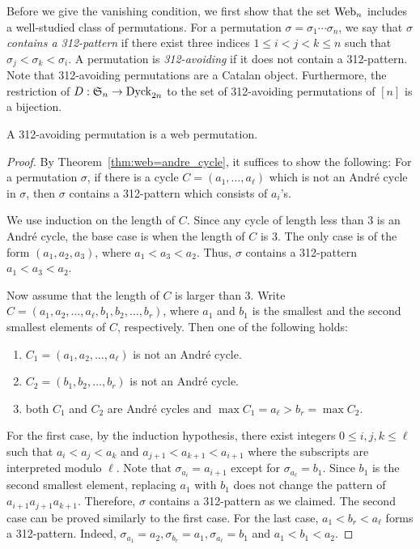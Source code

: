 Before we give the vanishing condition,
we first show that the set \( \operatorname{Web}_n \) includes a well-studied class of permutations.
For a permutation \( \sigma = \sigma_1\cdots \sigma_n \),
we say that \emph{\( \sigma \) contains a 312-pattern} if there exist three indices
\( 1\le i<j<k\le n \) such that \( \sigma_j<\sigma_k<\sigma_i \).
A permutation is \emph{312-avoiding} if it does not contain a 312-pattern.
Note that 312-avoiding permutations are a Catalan object. Furthermore,
the restriction of \( D:\mathfrak{S}_n\rightarrow \operatorname{Dyck}_{2n} \) to the set of
312-avoiding permutations of \( [n] \) is a bijection.
\begin{cor}\label{cor:312-avoiding}
  A 312-avoiding permutation is a web permutation.
\end{cor}
\begin{proof}
  By Theorem~\ref{thm:web=andre_cycle}, it suffices to show the following: 
  For a permutation \( \sigma \), if there is a cycle \(C=(a_1,\dots,a_\ell)\) which is not an Andr\'e cycle in \(\sigma\), then \(\sigma\) contains a 312-pattern which consists of $a_i$'s.

  We use induction on the length of \(C\).
  Since any cycle of length less than 3 is an Andr\'e cycle, the base case is when the length of \(C\) is 3. 
  The only case is of the form \((a_1,a_2,a_3)\), where \(a_1<a_3<a_2\). 
  Thus, \(\sigma\) contains a 312-pattern \(a_1<a_3<a_2\).

  Now assume that the length of \(C\) is larger than 3.
  Write \(C=(a_1,a_2,\dots,a_\ell, b_1,b_2,\dots,b_r)\), where \( a_1 \) and \( b_1 \) is the smallest and the second smallest elements of
  \( C \), respectively.
  Then one of the following holds:
  \begin{enumerate}[label=\roman*)]
    \item \(C_1=(a_1,a_2,\dots,a_\ell)\) is not an Andr\'e cycle.
    \item \(C_2=(b_1,b_2,\dots,b_r)\) is not an Andr\'e cycle.
    \item both \(C_1\) and \(C_2\) are Andr\'e cycles and $\max C_1=a_\ell>b_{r}=\max C_2$.
  \end{enumerate}
  
  For the first case, by the induction hypothesis, 
  there exist integers $0\le i,j,k\le\ell$ such that \(a_i<a_j<a_k\) and \(a_{j+1}<a_{k+1}<a_{i+1}\) where the subscripts are interpreted modulo $\ell$.
  Note that \(\sigma_{a_i}=a_{i+1}\) except for \(\sigma_{a_\ell}=b_1\). 
  Since $b_1$ is the second smallest element, replacing $a_1$ with $b_1$ does not change the pattern of \({a_{i+1}}{a_{j+1}}{a_{k+1}}\).
  Therefore, \(\sigma\) contains a 312-pattern as we claimed.
  The second case can be proved similarly to the first case.
  For the last case, $a_1<b_r<a_\ell$ forms a 312-pattern. 
  Indeed, $\sigma_{a_1}=a_2, \sigma_{b_r}=a_1, \sigma_{a_\ell}=b_1$ and $a_1<b_1<a_2$.
\end{proof}

